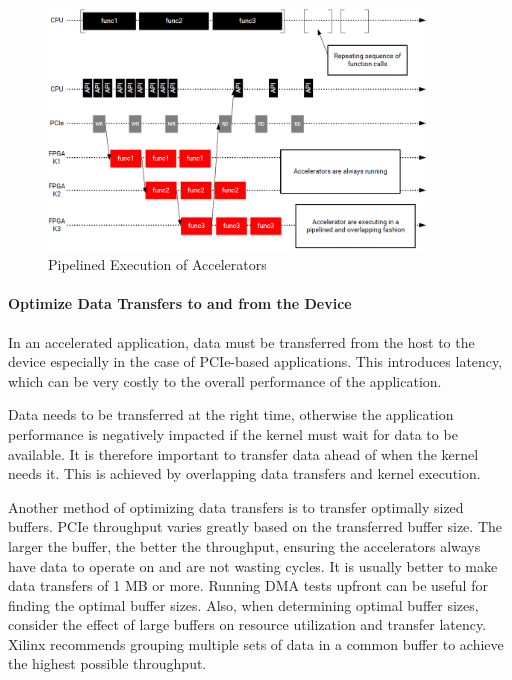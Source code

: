 \begin{figure}[H]
    \begin{center}
        \includegraphics[width=0.9\textwidth]{images/AcceleratorPipeline.PNG}
        \caption{Pipelined Execution of Accelerators}
        \label{AcceleratorPipeline}
    \end{center}
\end{figure}

\paragraph{Optimize Data Transfers to and from the Device}
In an accelerated application, data must be transferred from the host to the device especially in the case of PCIe-based applications. This introduces latency, which can be very costly to the overall performance of the application.

\par Data needs to be transferred at the right time, otherwise the application performance is negatively impacted if the kernel must wait for data to be available. It is therefore important to transfer data ahead of when the kernel needs it. This is achieved by overlapping data transfers and kernel execution.

\par Another method of optimizing data transfers is to transfer optimally sized buffers. PCIe throughput varies greatly based on the transferred buffer size. The larger the buffer, the better the throughput, ensuring the accelerators always have data to operate on and are not wasting cycles. It is usually better to make data transfers of 1 MB or more. Running DMA tests upfront can be useful for finding the optimal buffer sizes. Also, when determining optimal buffer sizes, consider the effect of large buffers on resource utilization and transfer latency. Xilinx recommends grouping multiple sets of data in a common buffer to achieve the highest possible throughput.

